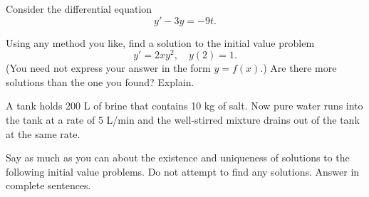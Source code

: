 \documentclass[11pt]{exam}
\begin{document}
\begin{questions}  

\question Consider the differential equation
\[
    y' - 3y = -9t.
\]


\question[25] Using any method you like, find a solution to the initial value problem
\[
    y' = 2xy^2, \quad y(2) = 1.
\]
(You need not express your answer in the form $y = f(x)$.) Are there more solutions than the one you found? Explain.


\question A tank holds \num{200} \si{\liter} of brine that contains \num{10} \si{\kilo\gram} of salt. Now pure water runs into the tank at a rate of \num{5} \si[per-mode=symbol]{\liter\per\minute} and the well-stirred mixture drains out of the tank at the same rate.



\question Say as much as you can about the existence and uniqueness of solutions to the following initial value problems. Do not attempt to find any solutions. Answer in complete sentences.



\end{questions}
\end{document}
